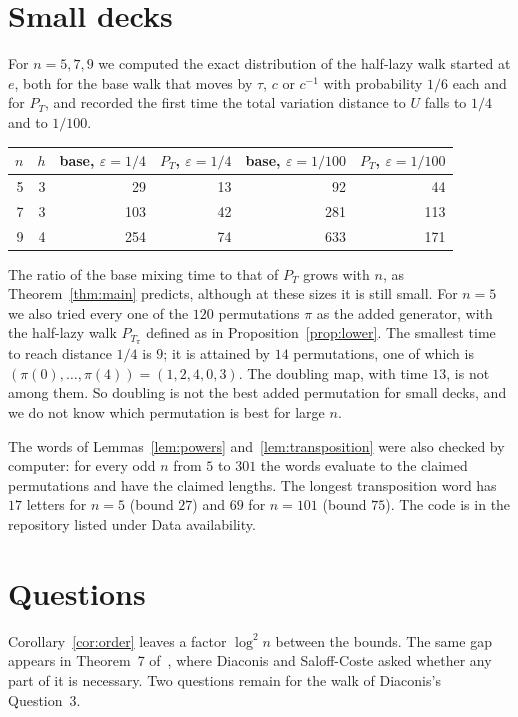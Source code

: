 \documentclass[11pt]{amsart}
\theoremstyle{remark}
\numberwithin{equation}{section}
\begin{document}
\section{Small decks}\label{sec:small}

For $n=5,7,9$ we computed the exact distribution of the half-lazy walk started at $e$, both for the base walk that moves by $\tau$, $c$ or $c^{-1}$ with probability $1/6$ each and for $P_T$, and recorded the first time the total variation distance to $U$ falls to $1/4$ and to $1/100$.

\begin{center}
\begin{tabular}{@{}rrrrrr@{}}\toprule
$n$ & $h$ & base, $\varepsilon=1/4$ & $P_T$, $\varepsilon=1/4$ & base, $\varepsilon=1/100$ & $P_T$, $\varepsilon=1/100$ \\ \midrule
5 & 3 & 29 & 13 & 92 & 44 \\
7 & 3 & 103 & 42 & 281 & 113 \\
9 & 4 & 254 & 74 & 633 & 171 \\ \bottomrule
\end{tabular}
\end{center}

\noindent The ratio of the base mixing time to that of $P_T$ grows with $n$, as Theorem~\ref{thm:main} predicts, although at these sizes it is still small. For $n=5$ we also tried every one of the $120$ permutations $\pi$ as the added generator, with the half-lazy walk $P_{T_\pi}$ defined as in Proposition~\ref{prop:lower}. The smallest time to reach distance $1/4$ is $9$; it is attained by $14$ permutations, one of which is $(\pi(0),\dots,\pi(4))=(1,2,4,0,3)$. The doubling map, with time $13$, is not among them. So doubling is not the best added permutation for small decks, and we do not know which permutation is best for large $n$.

The words of Lemmas~\ref{lem:powers} and~\ref{lem:transposition} were also checked by computer: for every odd $n$ from $5$ to $301$ the words evaluate to the claimed permutations and have the claimed lengths. The longest transposition word has $17$ letters for $n=5$ (bound $27$) and $69$ for $n=101$ (bound $75$). The code is in the repository listed under Data availability.

\section{Questions}\label{sec:open}

Corollary~\ref{cor:order} leaves a factor $\log^2 n$ between the bounds. The same gap appears in Theorem~7 of~\cite{DSC}, where Diaconis and Saloff-Coste asked whether any part of it is necessary. Two questions remain for the walk of Diaconis's Question~3.
\end{document}
